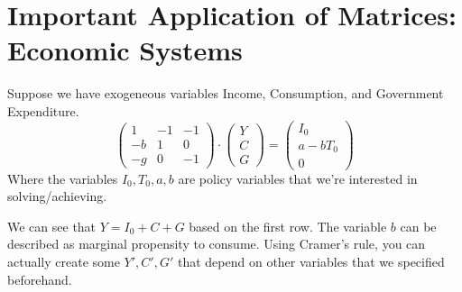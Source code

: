 \section*{Important Application of Matrices: Economic Systems}
Suppose we have exogeneous variables Income, Consumption, and Government Expenditure.
\begin{equation*}
    \begin{pmatrix}
    1  & -1 & -1 \\
    -b & 1 & 0 \\
    -g & 0 & -1
\end{pmatrix}
\cdot
\begin{pmatrix}
    Y \\
    C \\
    G
\end{pmatrix} = 
\begin{pmatrix}
    I_0 \\
    a-bT_0\\
    0
\end{pmatrix}
\end{equation*}
Where the variables $I_0, T_0, a, b$ are policy variables that we're interested in solving/achieving.

We can see that $Y = I_0 + C + G$ based on the first row. The variable $b$ can be described as marginal propensity to consume. Using Cramer's rule, you can actually create some $Y', C', G'$ that depend on other variables that we specified beforehand.


